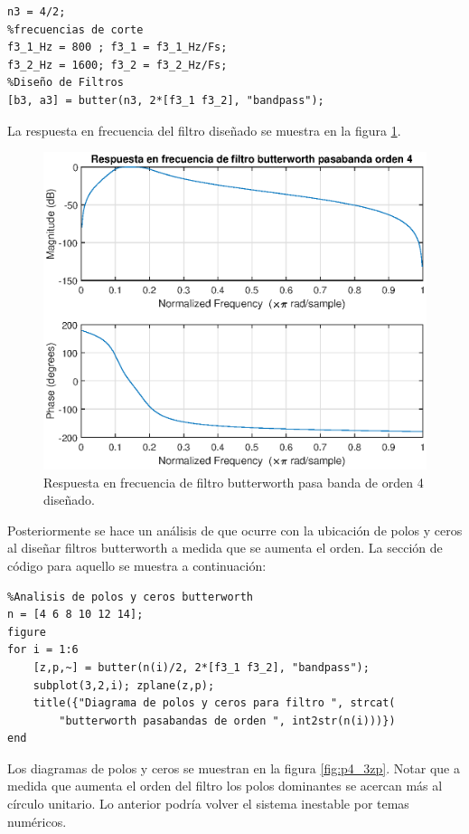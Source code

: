 \begin{enumerate}
\begin{lstlisting}[frame=single]
%orden
n3 = 4/2;
%frecuencias de corte
f3_1_Hz = 800 ; f3_1 = f3_1_Hz/Fs;
f3_2_Hz = 1600; f3_2 = f3_2_Hz/Fs;
%Diseño de Filtros
[b3, a3] = butter(n3, 2*[f3_1 f3_2], "bandpass");
\end{lstlisting}

La respuesta en frecuencia del filtro diseñado se muestra en la figura \ref{fig:p4_3}.

\begin{figure}[H]
    \centering
    \includegraphics[width = .8\linewidth]{Figuras/p4_3.eps}
    \caption{Respuesta en frecuencia de filtro butterworth pasa banda de orden 4 diseñado.}
    \label{fig:p4_3}
\end{figure}

Posteriormente se hace un análisis de que ocurre con la ubicación de polos y ceros al diseñar filtros butterworth a medida que se aumenta el orden. La sección de código para aquello se muestra a continuación:
\begin{lstlisting}
%Analisis de polos y ceros butterworth 
n = [4 6 8 10 12 14];
figure
for i = 1:6
    [z,p,~] = butter(n(i)/2, 2*[f3_1 f3_2], "bandpass");
    subplot(3,2,i); zplane(z,p);
    title({"Diagrama de polos y ceros para filtro ", strcat(
        "butterworth pasabandas de orden ", int2str(n(i)))})
end
\end{lstlisting}

Los diagramas de polos y ceros se muestran en la figura \ref{fig:p4_3zp}. Notar que a medida que aumenta el orden del filtro los polos dominantes se acercan más al círculo unitario. Lo anterior podría volver el sistema inestable por temas numéricos.


\end{enumerate}
